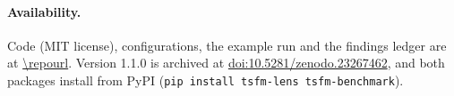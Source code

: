 \paragraph{Availability.} Code (MIT license), configurations, the example run and the findings ledger are at
\url{\repourl}. Version 1.1.0 is archived at \href{https://doi.org/10.5281/zenodo.23267462}{doi:10.5281/zenodo.23267462},
and both packages install from PyPI (\texttt{pip install tsfm-lens tsfm-benchmark}).
